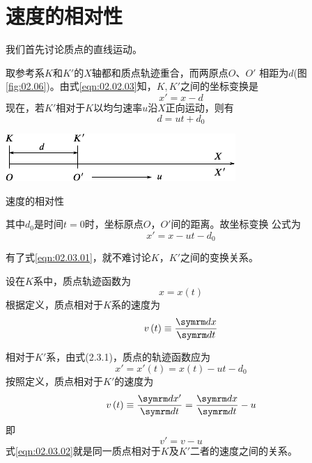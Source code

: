 \section{速度的相对性}\label{sec:02.03}

我们首先讨论质点的直线运动。

取参考系$K$和$K'$的$X$轴都和质点轨迹重合，而两原点$O$、$O'$
相距为$d$(图\ref{fig:02.06})。由式\eqref{eqn:02.02.03}知，$K,K'$之间的坐标变换是
\begin{equation*}
  x'=x-d
\end{equation*}
现在，若$K'$相对于$K$以均匀速率$u$沿$X$正向运动，则有
\begin{equation*}
  d=ut+d_0
\end{equation*}
\vspace{-1.56em}
\begin{figurex}[!h]
  \centering
  \includegraphics{figure/fig02.06}
  \caption{速度的相对性}
  \label{fig:02.06}
\end{figurex}

\noindent 其中$d_0$是时间$t=0$时，坐标原点$O$，$O'$间的距离。故坐标变换
公式为
\begin{equation}
  x'=x-ut-d_0 \label{eqn:02.03.01}
\end{equation}

有了式\eqref{eqn:02.03.01}，就不难讨论$K$，$K'$之间的变换关系。

设在$K$系中，质点轨迹函数为
\begin{equation*}
  x=x\left(t\right)
\end{equation*}
根据定义，质点相对于$ K $系的速度为
\begin{equation*}
  v\left(t\right)\equiv\frac{\dif x}{\dif t}
\end{equation*}

相对于$K'$系，由式(2.3.1)，质点的轨迹函数应为
\begin{equation*}
  x'=x'\left(t\right)=x\left(t\right)-ut-d_0
\end{equation*}
按照定义，质点相对于$K'$的速度为
\begin{equation*}
  v\left(t\right) \equiv\frac{\dif x'}{\dif t}=\frac{\dif x}{\dif t}-u
\end{equation*}\label{err:02.03.01}
即\vspace{-1.7em}
\begin{equation}
  v'=v-u \label{eqn:02.03.02}
\end{equation}
式\eqref{eqn:02.03.02}就是同一质点相对于$K$及$K'$二者的速度之间的关系。

